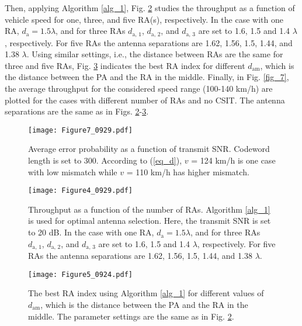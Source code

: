 \documentclass[conference]{IEEEtran}
\begin{document}
Then, applying Algorithm \ref{alg_1}, Fig. \ref{fig_5} studies the throughput as a function of vehicle speed for one, three, and five \ac{RA}(s), respectively. In the case with one \ac{RA}, $d_\text{a} = 1.5 \lambda$, and for three \acp{RA} $d_\text{a, 1}$, $d_\text{a, 2}$, and $d_\text{a, 3}$ are set to 1.6, 1.5 and 1.4 $\lambda$, respectively. For five \acp{RA} the antenna separations are 1.62, 1.56, 1.5, 1.44, and 1.38 $\lambda$. Using similar settings, i.e., the distance between \acp{RA} are the same for three and five \acp{RA}, Fig. \ref{fig_6} indicates the best \ac{RA} index for different $d_\text{am}$, which is the distance between the \ac{PA} and the \ac{RA} in the middle. Finally, in Fig. \ref{fig_7}, the average throughput for the considered speed range (100-140 km/h) are plotted for the cases with different number of \acp{RA} and no \ac{CSIT}. The antenna separations are the same as in Figs. \ref{fig_5}-\ref{fig_6}.



\begin{figure}
\centering
  \texttt{[image: Figure7\_0929.pdf]}\\
\caption{Average error probability as a function of transmit \ac{SNR}. Codeword length is set to 300. According to (\ref{eq_d}), $v$ = 124 km/h is one case with low mismatch while $v$ = 110 km/h has higher mismatch. }
\label{fig_4}
\end{figure}

\begin{figure}
\centering
  \texttt{[image: Figure4\_0929.pdf]}\\
\caption{Throughput as a function of the number of \acp{RA}. Algorithm \ref{alg_1} is used for optimal antenna selection. Here, the transmit \ac{SNR} is set to 20 dB. In the case with one \ac{RA}, $d_\text{a} = 1.5 \lambda$, and for three \acp{RA} $d_\text{a, 1}$, $d_\text{a, 2}$, and $d_\text{a, 3}$ are set to 1.6, 1.5 and 1.4 $\lambda$, respectively. For five \acp{RA} the antenna separations are 1.62, 1.56, 1.5, 1.44, and 1.38 $\lambda$.}
\label{fig_5}
\end{figure}

\begin{figure}
\centering
  \texttt{[image: Figure5\_0924.pdf]}\\
\caption{The best \ac{RA} index using Algorithm \ref{alg_1}  for different values of $d_\text{am}$, which is the distance between the \ac{PA} and the \ac{RA} in the middle. The parameter settings are the same as in Fig. \ref{fig_5}.}
\label{fig_6}
\end{figure}
\end{document}
